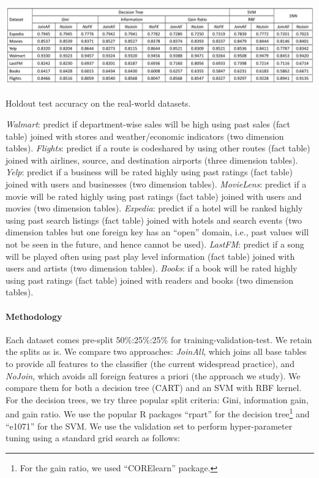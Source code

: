 \documentclass[sigconf]{acmart}
\begin{document}
\begin{table}[t]
\centering
\includegraphics[width=0.99\linewidth]{table2.pdf}
\caption{Holdout test accuracy on the real-world datasets.}
\label{Table:RealTest}
\vspace{-2mm}
\end{table}

\textit{Walmart}: predict if department-wise sales will be high using past sales (fact table) joined with stores and weather/economic indicators (two dimension tables).
\textit{Flights}: predict if a route is codeshared by using other routes (fact table) joined with airlines, source, and destination airports (three dimension tables).
\textit{Yelp}: predict if a business will be rated highly using past ratings (fact table) joined with users and businesses (two dimension tables).
\textit{MovieLens}: predict if a movie will be rated highly using past ratings (fact table) joined with users and movies (two dimension tables).
\textit{Expedia}: predict if a hotel will be ranked highly using past search listings (fact table) joined with hotels and search events (two dimension tables but one foreign key has an 
``open'' domain, i.e., past values will not be seen in the future, and hence cannot be used).
\textit{LastFM}: predict if a song will be played often using past play level information (fact table) joined with users and artists (two dimension tables).
\textit{Books}: if a book will be rated highly using past ratings (fact table) joined with readers and books (two dimension tables).

\vspace{-1mm}
\paragraph*{\textbf{Methodology}}
Each dataset comes pre-split 50\%:25\%:25\% for training-validation-test. We retain the splits as is.
We compare two approaches: \textit{JoinAll}, which joins all base tables to provide all features to the classifier (the current widespread practice), and \textit{NoJoin},
which avoids all foreign features a priori (the approach we study). We compare them for both a decision tree (CART) and an SVM with RBF kernel. For the decision trees, we 
try three popular split criteria: Gini, information gain, and gain ratio. We use the popular R packages ``rpart'' for the decision tree\footnote{For the gain 
ratio, we used ``CORElearn'' package.} and ``e1071'' for the SVM. We use the validation set to perform hyper-parameter tuning using a standard grid search as follows:
\end{document}
